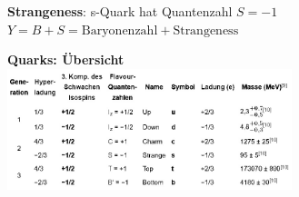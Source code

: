 \documentclass[10pt,twoside,a4paper]{article}
\begin{document}
\begin{multicols*}{3}
\textbf{Strangeness}: s-Quark hat Quantenzahl $S = -1$ \\
$Y = B+S = \text{Baryonenzahl} + \text{Strangeness}$


\textbf{Quarks: Übersicht}\\
\includegraphics[width=.33\textwidth, height=100pt]{tab_quark}

\end{multicols*}
\end{document}

